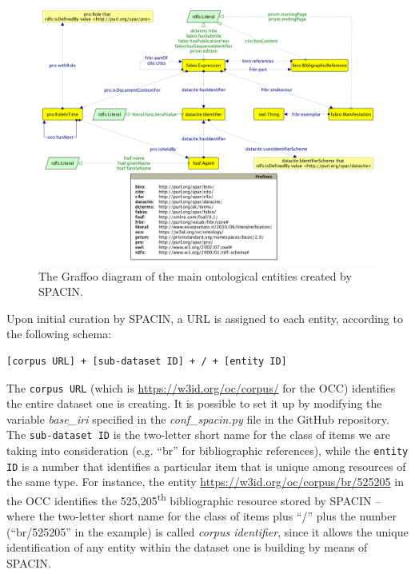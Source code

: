 \documentclass[runningheads,a4paper]{llncs}
\makeatletter
\def\maxwidth#1{\ifdim\Gin@nat@width>#1 #1\else\Gin@nat@width\fi}
\makeatother
\begin{document}
\begin{figure}[h!]
\centering
\includegraphics[width=\maxwidth{\textwidth}]{img/10000000000004F1000003C40B1D2514.png}
\cprotect\caption{The Graffoo diagram  \cite{__RefNumPara__14746_1591320820}of the main ontological entities created by SPACIN.}
\label{refIllustration0}
\end{figure}


Upon initial curation by SPACIN, a URL is assigned to each entity, according to the following schema: 

\begin{lstlisting}[mathescape]
[corpus URL] + [sub-dataset ID] + / + [entity ID]
\end{lstlisting}

The \Verb+corpus URL+ (which is \url{https://w3id.org/oc/corpus/} for the OCC) identifies the entire dataset one is creating. It is possible to set it up by modifying the variable {\em base\_iri} specified in the {\em conf\_spacin.py} file in the GitHub repository. The \Verb+sub-dataset ID+ is the two-letter short name for the class of items we are taking into consideration (e.g. ``br'' for bibliographic references), while the \Verb+entity ID+ is a number that identifies a particular item that is unique among resources of the same type. For instance, the entity \url{https://w3id.org/oc/corpus/br/525205} in the OCC identifies the 525,205\textsuperscript{th} bibliographic resource stored by SPACIN -- where the two-letter short name for the class of items plus ``/'' plus the number (``br/525205'' in the example) is called {\em corpus identifier}, since it allows the unique identification of any entity within the dataset one is building by means of SPACIN.
\end{document}
